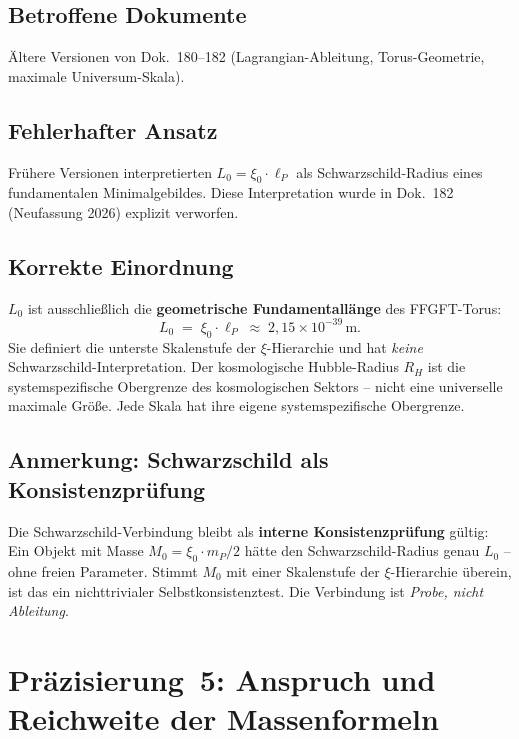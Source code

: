 \subsection*{Betroffene Dokumente}

Ältere Versionen von Dok.~180--182 (Lagrangian-Ableitung, Torus-Geometrie,
maximale Universum-Skala).

\subsection*{Fehlerhafter Ansatz}

Frühere Versionen interpretierten $L_0 = \xi_0 \cdot \ell_P$ als
Schwarzschild-Radius eines fundamentalen Minimalgebildes. Diese
Interpretation wurde in Dok.~182 (Neufassung 2026) explizit verworfen.

\subsection*{Korrekte Einordnung}

$L_0$ ist ausschließlich die \textbf{geometrische Fundamentallänge} des
FFGFT-Torus:
\begin{equation}
  L_0 \;=\; \xi_0 \cdot \ell_P \;\approx\; 2{,}15 \times 10^{-39}\,\text{m}.
  \tag{190.10}
\end{equation}
Sie definiert die unterste Skalenstufe der $\xi$-Hierarchie und hat
\emph{keine} Schwarzschild-Interpretation. Der kosmologische Hubble-Radius
$R_H$ ist die systemspezifische Obergrenze des kosmologischen Sektors --
nicht eine universelle maximale Größe. Jede Skala hat ihre eigene
systemspezifische Obergrenze.

\subsection*{Anmerkung: Schwarzschild als Konsistenzprüfung}

Die Schwarzschild-Verbindung bleibt als \textbf{interne Konsistenzprüfung} gültig:
Ein Objekt mit Masse $M_0 = \xi_0 \cdot m_P / 2$ hätte den Schwarzschild-Radius
genau $L_0$ -- ohne freien Parameter. Stimmt $M_0$ mit einer Skalenstufe der
$\xi$-Hierarchie überein, ist das ein nichttrivialer Selbstkonsistenztest.
Die Verbindung ist \emph{Probe, nicht Ableitung}.

\section{Präzisierung~5: Anspruch und Reichweite der Massenformeln}

